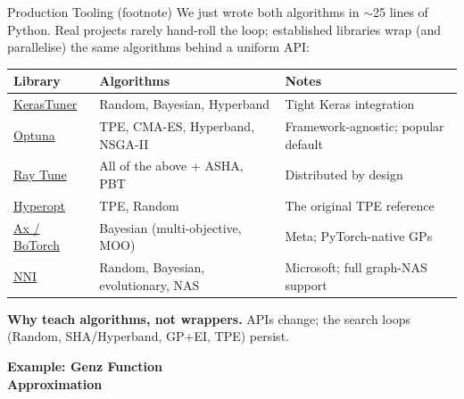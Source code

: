 \documentclass[aspectratio=169,11pt]{beamer}
\begin{document}
\begin{frame}{Production Tooling (footnote)}
We just wrote both algorithms in $\sim$25 lines of Python.  Real projects rarely hand-roll the loop; established libraries wrap (and parallelise) the same algorithms behind a uniform API:

\vspace{0.3cm}
\begin{center}
\renewcommand{\arraystretch}{1.15}
{\small
\begin{tabular}{@{}lll@{}}
\toprule
\textbf{Library} & \textbf{Algorithms} & \textbf{Notes} \\
\midrule
\href{https://keras.io/keras_tuner/}{KerasTuner}   & Random, Bayesian, Hyperband      & Tight Keras integration \\
\href{https://optuna.org/}{Optuna}                 & TPE, CMA-ES, Hyperband, NSGA-II  & Framework-agnostic; popular default \\
\href{https://docs.ray.io/en/latest/tune/}{Ray Tune} & All of the above + ASHA, PBT     & Distributed by design \\
\href{http://hyperopt.github.io/hyperopt/}{Hyperopt} & TPE, Random                      & The original TPE reference \\
\href{https://ax.dev/}{Ax / BoTorch}               & Bayesian (multi-objective, MOO)  & Meta; PyTorch-native GPs \\
\href{https://nni.readthedocs.io/}{NNI}            & Random, Bayesian, evolutionary, NAS & Microsoft; full graph-NAS support \\
\bottomrule
\end{tabular}}
\end{center}

\vspace{0.15cm}
{\scriptsize\textbf{Why teach algorithms, not wrappers.}  APIs change; the search loops (Random, SHA/Hyperband, GP+EI, TPE) persist.}
\end{frame}


{
\begin{frame}[plain,c]
\begin{center}
{\Huge\bfseries Example: Genz Function}\\[0.3cm]
{\Large\bfseries Approximation}
\end{center}
\end{frame}
}
\end{document}
